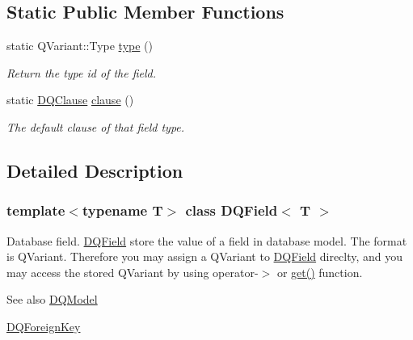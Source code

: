 \subsection*{Static Public Member Functions}
\begin{DoxyCompactItemize}
\item 
\hypertarget{classDQField_a0e5a0f071bf01560f4c47d233ca726e9}{
static QVariant::Type \hyperlink{classDQField_a0e5a0f071bf01560f4c47d233ca726e9}{type} ()}
\label{classDQField_a0e5a0f071bf01560f4c47d233ca726e9}

\begin{DoxyCompactList}\small\item\em Return the type id of the field. \item\end{DoxyCompactList}\item 
\hypertarget{classDQBaseField_a4cc6673744e8e43b55bf02854f08fa39}{
static \hyperlink{classDQClause}{DQClause} \hyperlink{classDQBaseField_a4cc6673744e8e43b55bf02854f08fa39}{clause} ()}
\label{classDQBaseField_a4cc6673744e8e43b55bf02854f08fa39}

\begin{DoxyCompactList}\small\item\em The default clause of that field type. \item\end{DoxyCompactList}\end{DoxyCompactItemize}


\subsection{Detailed Description}
\subsubsection*{template$<$typename T$>$ class DQField$<$ T $>$}

Database field. \hyperlink{classDQField}{DQField} store the value of a field in database model. The format is QVariant. Therefore you may assign a QVariant to \hyperlink{classDQField}{DQField} direclty, and you may access the stored QVariant by using operator-\/$>$ or \hyperlink{classDQField_a17e36ac914ae0dd938f081f9ade514c7}{get()} function.

\begin{DoxySeeAlso}{See also}
\hyperlink{classDQModel}{DQModel} 

\hyperlink{classDQForeignKey}{DQForeignKey} 
\end{DoxySeeAlso}


